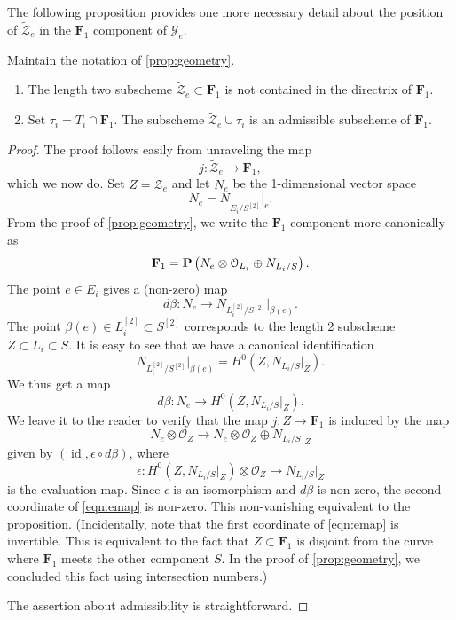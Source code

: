 \documentclass[12pt,reqno]{amsart}
\DeclareMathOperator{\id}{id}
\renewcommand{\to}{{\longrightarrow}}
\numberwithin{equation}{section}
\renewcommand{\O}{\mathcal O}
\newcommand{\F}{\mathbf F}
\newcommand{\td}{\widetilde}
\begin{document}
The following proposition provides one more necessary detail about the position of $\widetilde {\mathcal Z}_e$ in the $\F_1$ component of $\mathcal Y_e$.
\begin{proposition}
  \label{prop:nodirectrix}
  Maintain the notation of \autoref{prop:geometry}.
  \begin{enumerate}
  \item The length two
    subscheme $\td{\mathcal{Z}}_{e} \subset \F_{1}$ is not contained in the directrix of $\F_{1}$.
  \item Set $\tau_i = T_i \cap \F_1$.
    The subscheme $\td{\mathcal Z}_e \cup \tau_i$ is an admissible subscheme of $\F_1$.
  \end{enumerate}
\end{proposition}
\begin{proof}
  The proof follows easily from unraveling the map
  \[ j \colon \widetilde {\mathcal Z}_e \to \F_1,\]
  which we now do.
  Set $Z = \widetilde{\mathcal Z}_e$ and let $N_e$ be the 1-dimensional vector space
  \[ N_e = N_{E_i/\widetilde{S^{[2]}}} \big|_e. \]
  From the proof of \autoref{prop:geometry}, we write the $\F_1$ component more canonically as
  \[
    \F_1 = \P\left(N_e \otimes \O_{L_i} \oplus N_{L_i/S}\right).
  \]
  The point $e \in E_i$ gives a (non-zero) map
  \[
    d \beta \colon N_e \to N_{L^{[2]}_i / S^{[2]}}|_{\beta(e)}.
  \]
  The point $\beta(e) \in L^{[2]}_i \subset S^{[2]}$ corresponds to the length 2 subscheme $Z \subset L_i \subset S$.
  It is easy to see that we have a canonical identification
  \[
    N_{L^{[2]}_i / S^{[2]}}\big |_{\beta(e)} = H^0\left(Z, N_{L_i/S}|_Z\right).
  \]
  We thus get a map
  \[
    d \beta \colon N_e \to H^0\left(Z, N_{L_i/S}|_Z\right).
  \]
  We leave it to the reader to verify that the map $j \colon Z \to \F_1$ is induced by the map
  \begin{equation}\label{eqn:emap}
    N_e \otimes \O_Z \to N_e \otimes \O_Z \oplus N_{L_i/S}|_Z
  \end{equation}
  given by $(\id, \epsilon \circ d\beta)$, where
  \[
    \epsilon \colon H^0\left(Z, N_{L_i/S}|_Z\right) \otimes \O_Z \to N_{L_i/S}|_Z
  \]
  is the evaluation map.
  Since $\epsilon$ is an isomorphism and $d \beta$ is non-zero, the second coordinate of \eqref{eqn:emap} is non-zero.
  This non-vanishing equivalent to the proposition.
  (Incidentally, note that the first coordinate of \eqref{eqn:emap} is invertible.
  This is equivalent to the fact that $Z \subset \F_1$ is disjoint from the curve where $\F_1$ meets the other component $S$.
  In the proof of \autoref{prop:geometry}, we concluded this fact using intersection numbers.)

  The assertion about admissibility is straightforward.
\end{proof}
\end{document}
